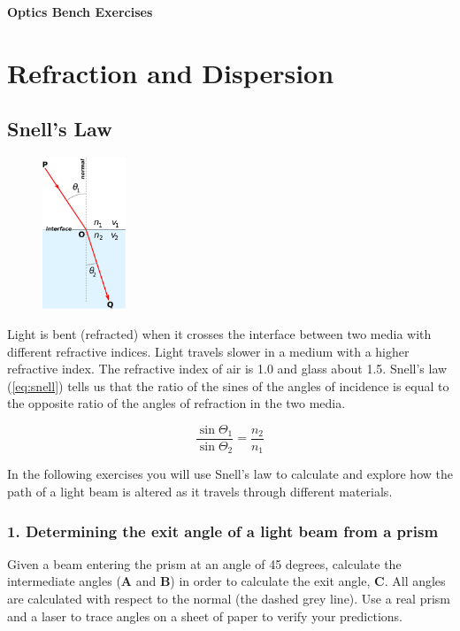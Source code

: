 \documentclass[a4paper]{report}
\begin{document}
\setcounter{secnumdepth}{2}

\begin{center}
\textbf{\Large{Optics Bench Exercises}}
\end{center}

\section{Refraction and Dispersion}
\subsection{Snell's Law}
\begin{figure}
\centering
\includegraphics[width=2.5cm]{Snells_law2.eps}
\label{fig:snell}
\end{figure}
Light is bent (refracted) when it crosses the interface between two
media with different refractive indices. Light travels slower in a
medium with a higher refractive index. The refractive index of air is
1.0 and glass about 1.5. Snell's law (\ref{eq:snell}) tells us
that the ratio of the sines of the angles of incidence is equal to the
opposite ratio of the angles of refraction in the two media.

\begin{equation}
\label{eq:snell}
\frac{\sin\Theta_1}{\sin\Theta_2} = \frac{n_2}{n_1}
\end{equation}


In the following exercises you will use Snell's law to calculate and
explore how the path of a light beam is altered as it travels through
different materials. 

\subsubsection{1. Determining the exit angle of a light beam from a prism}
Given a beam entering the prism at an angle of 45
degrees, calculate the intermediate angles (\textbf{A} and \textbf{B})
in order to calculate the exit angle, \textbf{C}. All angles are
calculated with respect to the normal (the dashed grey line). Use a
real prism and a laser to trace angles on a sheet of paper to verify
your predictions.
\end{document}
